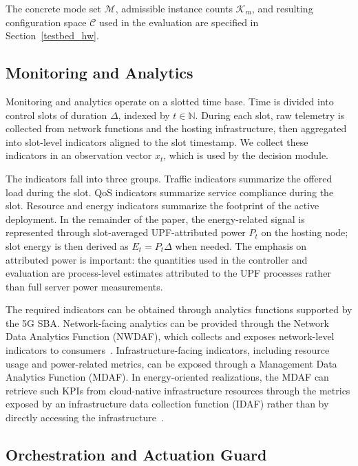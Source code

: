 \documentclass[a4paper,fleqn]{cas-sc}
\begin{document}
The concrete mode set $\mathcal{M}$, admissible instance counts $\mathcal{K}_m$, and resulting configuration space $\mathcal{C}$ used in the evaluation are specified in Section~\ref{testbed_hw}.

\subsection{Monitoring and Analytics}
\label{subsec:monitoring}

Monitoring and analytics operate on a slotted time base. Time is divided into control slots of duration $\Delta$, indexed by $t\in\mathbb{N}$. During each slot, raw telemetry is collected from network functions and the hosting infrastructure, then aggregated into slot-level indicators aligned to the slot timestamp. We collect these indicators in an observation vector $x_t$, which is used by the decision module.

The indicators fall into three groups. Traffic indicators summarize the offered load during the slot. QoS indicators summarize service compliance during the slot. Resource and energy indicators summarize the footprint of the active deployment. In the remainder of the paper, the energy-related signal is represented through slot-averaged UPF-attributed power $P_t$ on the hosting node; slot energy is then derived as $E_t=P_t\Delta$ when needed. The emphasis on attributed power is important: the quantities used in the controller and evaluation are process-level estimates attributed to the UPF processes rather than full server power measurements.

The required indicators can be obtained through analytics functions supported by the 5G SBA. Network-facing analytics can be provided through the Network Data Analytics Function (NWDAF), which collects and exposes network-level indicators to consumers~\cite{bolla10465014}. Infrastructure-facing indicators, including resource usage and power-related metrics, can be exposed through a Management Data Analytics Function (MDAF). In energy-oriented realizations, the MDAF can retrieve such KPIs from cloud-native infrastructure resources through the metrics exposed by an infrastructure data collection function (IDAF) rather than by directly accessing the infrastructure~\cite{AKBARI2025111487}.

\subsection{Orchestration and Actuation Guard}
\label{subsec:actuation}
\end{document}
